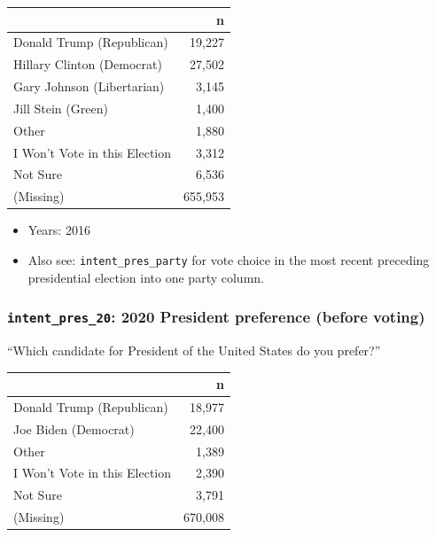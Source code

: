 \documentclass[10pt,article,oneside]{memoir}
\begin{document}
\begin{table}[H]
\centering
\begin{tabular}[t]{lr}
\toprule
 & n\\
\midrule
Donald Trump (Republican) & 19,227\\
Hillary Clinton (Democrat) & 27,502\\
Gary Johnson (Libertarian) & 3,145\\
Jill Stein (Green) & 1,400\\
Other & 1,880\\
I Won't Vote in this Election & 3,312\\
Not Sure & 6,536\\
(Missing) & 655,953\\
\bottomrule
\end{tabular}
\end{table}

\begin{itemize}
\tightlist
\item
  Years: 2016
\item
  Also see: \texttt{intent\_pres\_party} for vote choice in the most
  recent preceding presidential election into one party column.
\end{itemize}

\subsubsection{\texorpdfstring{\texttt{intent\_pres\_20}: 2020 President
preference (before
voting)}{intent\_pres\_20: 2020 President preference (before voting)}}\label{intent_pres_20-2020-president-preference-before-voting}

``Which candidate for President of the United States do you prefer?''

\begin{table}[H]
\centering
\begin{tabular}[t]{lr}
\toprule
 & n\\
\midrule
Donald Trump (Republican) & 18,977\\
Joe Biden (Democrat) & 22,400\\
Other & 1,389\\
I Won't Vote in this Election & 2,390\\
Not Sure & 3,791\\
(Missing) & 670,008\\
\bottomrule
\end{tabular}
\end{table}
\end{document}

